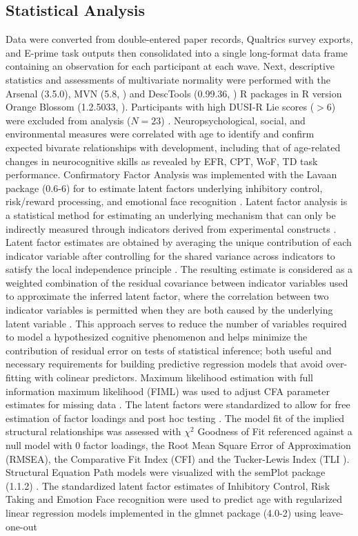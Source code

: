\documentclass[utf8]{frontiersSCNS} %
\begin{document}
\subsection{Statistical Analysis} Data were converted from double-entered paper records, Qualtrics survey exports, and E-prime task outputs then consolidated into a single long-format data frame containing an observation for each participant at each wave. Next, descriptive statistics and assessments of multivariate normality were performed with the Arsenal (3.5.0), MVN (5.8, \cite{MVN}) and DescTools (0.99.36, \cite{DescTools}) R packages in R version Orange Blossom (1.2.5033, \cite{R}). Participants with high DUSI-R Lie scores ($>6$) were excluded from analysis ($N=23$) \citep{dalla2003effects}. Neuropsychological, social, and environmental measures were correlated with age to identify and confirm expected bivarate relationships with development, including that of age-related changes in neurocognitive skills as revealed by EFR, CPT, WoF, TD task performance. Confirmatory Factor Analysis was implemented with the Lavaan package (0.6-6) for to estimate latent factors underlying inhibitory control, risk/reward processing, and emotional face recognition \citep{Lavaan}. Latent factor analysis is a statistical method for estimating an underlying mechanism that can only be indirectly measured through indicators derived from experimental constructs \citep{finch2015latent}. Latent factor estimates are obtained by averaging the unique contribution of each indicator variable after controlling for the shared variance across indicators to satisfy the local independence principle \citep{sobel1997measurement}. The resulting estimate is considered as a weighted combination of the residual covariance between indicator variables used to approximate the inferred latent factor, where the correlation between two indicator variables is permitted when they are both caused by the underlying latent variable \citep{cooper2019neuroimaging}. This approach serves to reduce the number of variables required to model a hypothesized cognitive phenomenon and helps minimize the contribution of residual error on tests of statistical inference; both useful and necessary requirements for building predictive regression models that avoid over-fitting with colinear predictors. Maximum likelihood estimation with full information maximum likelihood (FIML) was used to adjust CFA parameter estimates for missing data \citep{cham2017full}. The latent factors were standardized to allow for free estimation of factor loadings and post hoc testing \citep{HuTzeBentler1998}. The model fit of the implied structural relationships was assessed with $\chi^2$ Goodness of Fit referenced against a null model with $0$ factor loadings, the Root Mean Square Error of Approximation (RMSEA), the Comparative Fit Index (CFI) and the Tucker-Lewis Index (TLI \cite{KennyEtAl2015,HuTzeBentler1999, wu2009evaluating}). Structural Equation Path models were visualized with the semPlot package (1.1.2) . The standardized latent factor estimates of Inhibitory Control, Risk Taking and Emotion Face recognition were used to predict age with regularized linear regression models implemented in the glmnet package (4.0-2) using leave-one-out 
\end{document}
